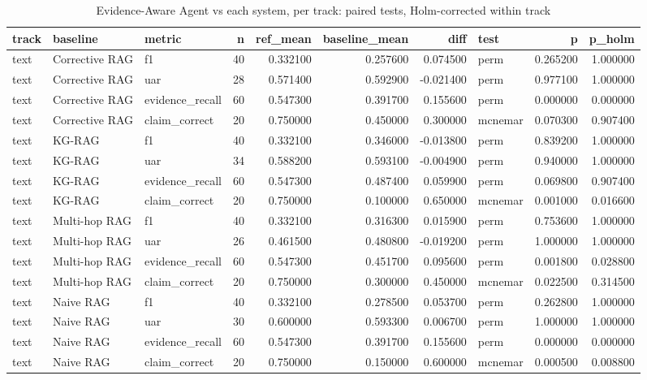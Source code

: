 \begin{table}
\caption{Evidence-Aware Agent vs each system, per track: paired tests, Holm-corrected within track}
\label{tab:table_significance}
\begin{tabular}{lllrrrrlrr}
\toprule
track & baseline & metric & n & ref\_mean & baseline\_mean & diff & test & p & p\_holm \\
\midrule
text & Corrective RAG & f1 & 40 & 0.332100 & 0.257600 & 0.074500 & perm & 0.265200 & 1.000000 \\
text & Corrective RAG & uar & 28 & 0.571400 & 0.592900 & -0.021400 & perm & 0.977100 & 1.000000 \\
text & Corrective RAG & evidence\_recall & 60 & 0.547300 & 0.391700 & 0.155600 & perm & 0.000000 & 0.000000 \\
text & Corrective RAG & claim\_correct & 20 & 0.750000 & 0.450000 & 0.300000 & mcnemar & 0.070300 & 0.907400 \\
text & KG-RAG & f1 & 40 & 0.332100 & 0.346000 & -0.013800 & perm & 0.839200 & 1.000000 \\
text & KG-RAG & uar & 34 & 0.588200 & 0.593100 & -0.004900 & perm & 0.940000 & 1.000000 \\
text & KG-RAG & evidence\_recall & 60 & 0.547300 & 0.487400 & 0.059900 & perm & 0.069800 & 0.907400 \\
text & KG-RAG & claim\_correct & 20 & 0.750000 & 0.100000 & 0.650000 & mcnemar & 0.001000 & 0.016600 \\
text & Multi-hop RAG & f1 & 40 & 0.332100 & 0.316300 & 0.015900 & perm & 0.753600 & 1.000000 \\
text & Multi-hop RAG & uar & 26 & 0.461500 & 0.480800 & -0.019200 & perm & 1.000000 & 1.000000 \\
text & Multi-hop RAG & evidence\_recall & 60 & 0.547300 & 0.451700 & 0.095600 & perm & 0.001800 & 0.028800 \\
text & Multi-hop RAG & claim\_correct & 20 & 0.750000 & 0.300000 & 0.450000 & mcnemar & 0.022500 & 0.314500 \\
text & Naive RAG & f1 & 40 & 0.332100 & 0.278500 & 0.053700 & perm & 0.262800 & 1.000000 \\
text & Naive RAG & uar & 30 & 0.600000 & 0.593300 & 0.006700 & perm & 1.000000 & 1.000000 \\
text & Naive RAG & evidence\_recall & 60 & 0.547300 & 0.391700 & 0.155600 & perm & 0.000000 & 0.000000 \\
text & Naive RAG & claim\_correct & 20 & 0.750000 & 0.150000 & 0.600000 & mcnemar & 0.000500 & 0.008800 \\

\end{tabular}
\end{table}
